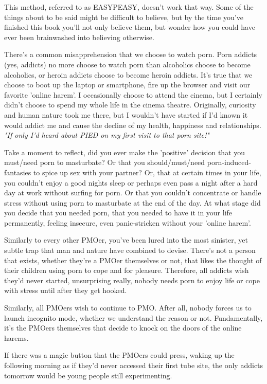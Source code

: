 \documentclass[easypeasy.tex]{subfiles}
\begin{document}
This method, referred to as EASYPEASY, doesn't work that way. Some of the things about to be said might be difficult to believe, but by the time you've finished this book you'll not only believe them, but wonder how you could have ever been brainwashed into believing otherwise.

There's a common misapprehension that we choose to watch porn. Porn addicts (yes, addicts) no more choose to watch porn than alcoholics choose to become alcoholics, or heroin addicts choose to become heroin addicts. It's true that we choose to boot up the laptop or smartphone, fire up the browser and visit our favorite 'online harem'. I occasionally choose to attend the cinema, but I certainly didn't choose to spend my whole life in the cinema theatre. Originally, curiosity and human nature took me there, but I wouldn't have started if I'd known it would addict me and cause the decline of my health, happiness and relationships.
\textit{"If only I'd heard about PIED on my first visit to that porn site!"}

Take a moment to reflect, did you ever make the 'positive' decision that you must/need porn to masturbate? Or that you should/must/need porn-induced-fantasies to spice up sex with your partner? Or, that at certain times in your life, you couldn't enjoy a good nights sleep or perhaps even pass a night after a hard day at work without surfing for porn. Or that you couldn't concentrate or handle stress without using porn to masturbate at the end of the day. At what stage did you decide that you needed porn, that you needed to have it in your life permanently, feeling insecure, even panic-stricken without  your 'online harem'.

Similarly to every other PMOer, you've been lured into the most sinister, yet subtle trap that man and nature have combined to devise. There's not a person that exists, whether they're a PMOer themselves or not, that likes the thought of their children using porn to cope and for pleasure. Therefore, all addicts wish they'd never started, unsurprising really, nobody needs porn to enjoy life or cope with stress until after they get hooked.

Similarly, all PMOers wish to continue to PMO. After all, nobody forces us to launch incognito mode, whether we understand the reason or not. Fundamentally, it's the PMOers themselves that decide to knock on the doors of the online harems.

If there was a magic button that the PMOers could press, waking up the following morning as if they'd never accessed their first tube site, the only addicts tomorrow would be young people still experimenting.
\end{document}
